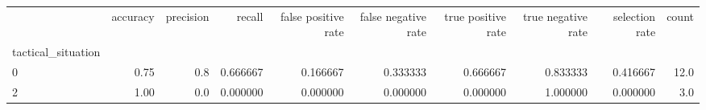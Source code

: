 \begin{tabular}{lrrrrrrrrr}
\toprule
{} &  accuracy &  precision &    recall &  false positive rate &  false negative rate &  true positive rate &  true negative rate &  selection rate &  count \\
tactical\_situation &           &            &           &                      &                      &                     &                     &                 &        \\
\midrule
0                  &      0.75 &        0.8 &  0.666667 &             0.166667 &             0.333333 &            0.666667 &            0.833333 &        0.416667 &   12.0 \\
2                  &      1.00 &        0.0 &  0.000000 &             0.000000 &             0.000000 &            0.000000 &            1.000000 &        0.000000 &    3.0 \\
\bottomrule
\end{tabular}
